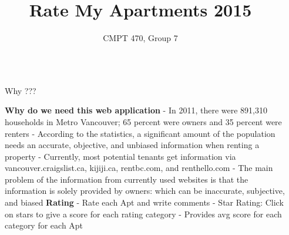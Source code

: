 \documentclass[final]{beamer}
\title{Rate My Apartments 2015} %
\author{CMPT 470, Group 7} %
\institute{June 1 - Present } %
\newlength{\sepwid}
\newlength{\onecolwid}
\begin{document}

\setlength{\belowcaptionskip}{2ex} %
\setlength\belowdisplayshortskip{2ex} %

\begin{frame}[t] %

\begin{columns}[t] %

\begin{column}{\sepwid}\end{column} %

\begin{column}{\onecolwid} %





\begin{block}{Why ???}

\textbf{Why do we need this web application}\newline
- In 2011, there were 891,310 households in Metro Vancouver; 65 percent were owners and 35 percent were renters\newline
- According to the statistics, a significant amount of the population needs an accurate, objective, and unbiased information when renting a property\newline
- Currently, most potential tenants get information via vancouver.craigslist.ca, kijiji.ca, rentbc.com, and renthello.com \newline
- The main problem of the information from currently used websites is that the information is solely provided by owners: which can be inaccurate, subjective, and biased \newline\newline
\textbf{Rating} \newline
- Rate each Apt and write comments\newline
- Star Rating: Click on stars to give a score for each rating category\newline
- Provides avg score for each category for each Apt\newline


\end{block}
\end{column}
\end{columns}
\end{frame}
\end{document}

